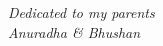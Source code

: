 \thispagestyle{empty}
\begin{titlepage}
    \centering
    \vspace*{\fill}
        \textit{Dedicated to my parents}\\
        \vspace{0.5cm}
        \textit{Anuradha \& Bhushan}
    \vspace*{\fill}
\end{titlepage}